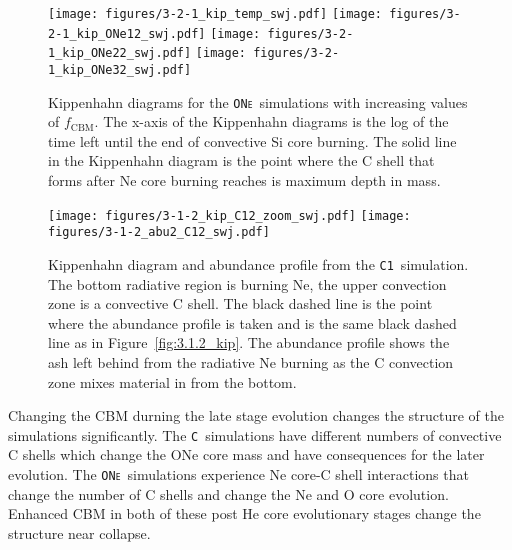 \documentclass[useAMS,usenatbib]{mn2e}
\newcommand{\fcbm}{\ensuremath{f_\mathrm{CBM}}}
\newcommand{\Ca}{\textsc{\texttt{C1}}}
\newcommand{\C}{\textsc{\texttt{C}}}
\newcommand{\ONe}{\textsc{\texttt{ONe}}}
\begin{document}
\begin{figure}
	\texttt{[image: figures/3-2-1\_kip\_temp\_swj.pdf]}
	\texttt{[image: figures/3-2-1\_kip\_ONe12\_swj.pdf]}
	\texttt{[image: figures/3-2-1\_kip\_ONe22\_swj.pdf]}
	\texttt{[image: figures/3-2-1\_kip\_ONe32\_swj.pdf]}
	\caption{
		Kippenhahn diagrams for the \ONe\ simulations with increasing values 
		of \fcbm. The x-axis of the Kippenhahn 
		diagrams is the log of the time left until the end of convective Si core 
		burning. The solid line in the Kippenhahn diagram is the point where 
		the C shell that forms after Ne core burning reaches is maximum 
		depth in mass.
	}
	\label{fig:3.2.1_kip} %
\end{figure}

\begin{figure}
	\texttt{[image: figures/3-1-2\_kip\_C12\_zoom\_swj.pdf]}
	\texttt{[image: figures/3-1-2\_abu2\_C12\_swj.pdf]}
	\caption{
		Kippenhahn diagram and abundance profile from the \Ca\ simulation. 
		The bottom radiative region is burning Ne, the upper convection zone 
		is a convective C shell. The black dashed line is the point where the 
		abundance profile is taken and is the same black dashed line as in Figure~\ref{fig:3.1.2_kip}. The abundance profile shows the ash 
		left behind from the radiative Ne burning as the C convection zone 
		mixes material in from the bottom.
	}
	\label{fig:3.1.2_kip_abu_C12} %
\end{figure}


Changing the CBM durning the late stage evolution changes the structure of the
simulations significantly. The \C\ simulations have different numbers of
convective C shells which change the ONe core mass and have consequences 
for the later evolution. The \ONe\
simulations experience Ne core-C shell interactions that change the number of C
shells and change the Ne and O core evolution.  Enhanced CBM in both of these 
post He core evolutionary stages change the structure near collapse.
\end{document}
